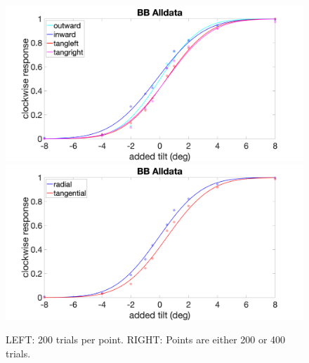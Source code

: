 \documentclass[11pt]{article} %
\begin{document}
\begin{figure}[H]
\centering %
\includegraphics[scale=.16]{Images/BB_PF_Alldata_4conds.png}
\includegraphics[scale=.16]{Images/BB_PF_Alldata_2conds.png}
\caption{LEFT: 200 trials per point. RIGHT: Points are either 200 or 400 trials.}
\end{figure}

\newpage
\end{document}
